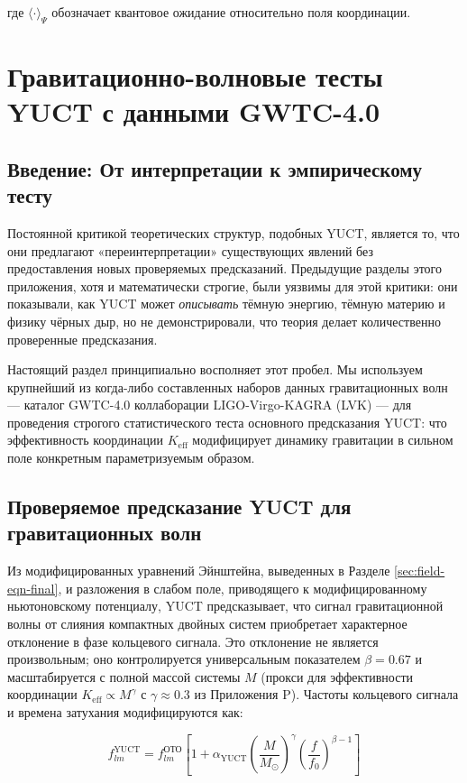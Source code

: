 \documentclass[12pt,a4paper]{article}
\theoremstyle{remark}
\newcommand{\Keff}{K_{\mathrm{eff}}}
\begin{document}
	где $\langle \cdot \rangle_{\Psi}$ обозначает квантовое ожидание относительно поля координации.
	
	\section{Гравитационно-волновые тесты YUCT с данными GWTC-4.0}
	\label{sec:gw-tests}
	
	\subsection{Введение: От интерпретации к эмпирическому тесту}
	
	Постоянной критикой теоретических структур, подобных YUCT, является то, что они предлагают «переинтерпретации» существующих явлений без предоставления новых проверяемых предсказаний. Предыдущие разделы этого приложения, хотя и математически строгие, были уязвимы для этой критики: они показывали, как YUCT может \textit{описывать} тёмную энергию, тёмную материю и физику чёрных дыр, но не демонстрировали, что теория делает количественно проверенные предсказания.
	
	Настоящий раздел принципиально восполняет этот пробел. Мы используем крупнейший из когда-либо составленных наборов данных гравитационных волн — каталог GWTC-4.0 коллаборации LIGO-Virgo-KAGRA (LVK) — для проведения строгого статистического теста основного предсказания YUCT: что эффективность координации $\Keff$ модифицирует динамику гравитации в сильном поле конкретным параметризуемым образом.
	
	\subsection{Проверяемое предсказание YUCT для гравитационных волн}
	
	Из модифицированных уравнений Эйнштейна, выведенных в Разделе \ref{sec:field-eqn-final}, и разложения в слабом поле, приводящего к модифицированному ньютоновскому потенциалу, YUCT предсказывает, что сигнал гравитационной волны от слияния компактных двойных систем приобретает характерное отклонение в фазе кольцевого сигнала. Это отклонение не является произвольным; оно контролируется универсальным показателем $\beta = 0.67$ и масштабируется с полной массой системы $M$ (прокси для эффективности координации $\Keff \propto M^{\gamma}$ с $\gamma \approx 0.3$ из Приложения P). Частоты кольцевого сигнала и времена затухания модифицируются как:
	
	\begin{equation}
		f_{lm}^{\text{YUCT}} = f_{lm}^{\text{ОТО}} \left[ 1 + \alpha_{\text{YUCT}} \left( \frac{M}{M_\odot} \right)^{\gamma} \left( \frac{f}{f_0} \right)^{\beta-1} \right]
		\label{eq:freq-mod}
	\end{equation}
	
\end{document}
